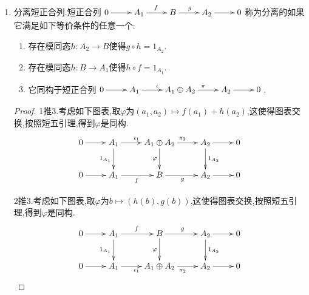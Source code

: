 \begin{enumerate}
\begin{enumerate}
\begin{proof}
			最后说明$\ker g'\subset\mathrm{im}f'$.任取$b'\in\ker g'$,那么存在$b\in B$使得$\beta(b)=b'$.于是$0=g'\circ\beta(b)=\gamma\circ g(b)$,从$\gamma$是同构说明$g(b)=0$,于是$b\in\ker g=\mathrm{im}f$,于是存在$a\in A$使得$b=f(a)$.于是$b'=\beta\circ f(a)=f'\circ\alpha(a)$,于是$b'\in\mathrm{im}f'$,这就得证.
		\end{proof}
		\item 上一条说明,如果有如下交换图,其中每个$h_n$都是模同构,那么$\{A_n,f_n\}$是正合列当且仅当$\{B_n,g_n\}$是正合列.
		$$\xymatrix{\cdots\ar[r]&A_{n-1}\ar[d]_{h_{n-1}}\ar[r]^{f_n}&A_n\ar[d]_{h_n}\ar[r]^{f_{n+1}}&A_{n+1}\ar[d]_{h_{n+1}}\ar[r]&\cdots\\\cdots\ar[r]&B_{n-1}\ar[r]^{g_n}&B_n\ar[r]^{g_{n+1}}&B_{n+1}\ar[r]&\cdots}$$
	\end{enumerate}
    \item 分离短正合列.短正合列$\xymatrix{0\ar[r]&A_1\ar[r]^{f}&B\ar[r]^{g}&A_2\ar[r]&0}$称为分离的如果它满足如下等价条件的任意一个:
    \begin{enumerate}
    	\item 存在模同态$h:A_2\to B$使得$g\circ h=1_{A_2}$.
    	\item 存在模同态$h:B\to A_1$使得$h\circ f=1_{A_1}$.
    	\item 它同构于短正合列$\xymatrix{0\ar[r]&A_1\ar[r]^{\iota}&A_1\oplus A_2\ar[r]^{\pi}&A_2\ar[r]&0}$.
    \end{enumerate}
    \begin{proof}
    	
    	1推3.考虑如下图表,取$\varphi$为$(a_1,a_2)\mapsto f(a_1)+h(a_2)$,这使得图表交换,按照短五引理,得到$\varphi$是同构.
    	$$\xymatrix{
    		0\ar[r]&A_1\ar[r]^{\iota_1}\ar[d]_{1_{A_1}}&A_1\oplus A_2\ar[r]^{\pi_2}\ar[d]_{\varphi}&A_2\ar[r]\ar[d]^{1_{A_2}}&0\\
    		0\ar[r]&A_1\ar[r]_{f}&B\ar[r]_{g}&A_2\ar[r]&0}$$
    	
    	2推3.考虑如下图表,取$\varphi$为$b\mapsto(h(b),g(b))$,这使得图表交换,按照短五引理,得到$\varphi$是同构.
    	$$\xymatrix{
    		0\ar[r]&A_1\ar[r]^{f}\ar[d]_{1_{A_1}}&B\ar[r]^{g}\ar[d]_{\varphi}&A_2\ar[r]\ar[d]^{1_{A_2}}&0\\
    		0\ar[r]&A_1\ar[r]_{\iota_1}&A_1\oplus A_2\ar[r]_{\pi_2}&A_2\ar[r]&0}$$
    	

\end{proof}
\end{enumerate}
